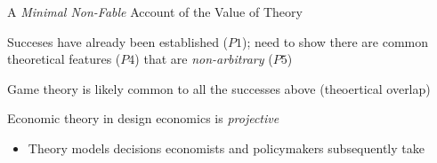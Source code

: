\documentclass[aspectratio=169,xcolor=dvipsnames]{beamer}
\begin{document}
\begin{frame}{A \textit{Minimal Non-Fable} Account of the Value of Theory}

\vspace{5mm}
Succeses have already been established ($P1$); need to show there are common theoretical features ($P4$) that are \textit{non-arbitrary} ($P5$)

\vspace{5mm}
Game theory is likely common to all the successes above (theoertical overlap)

\vspace{5mm}
Economic theory in design economics is \textit{projective} \autocite{guala2001}
\begin{itemize}
    \item Theory models decisions economists and policymakers subsequently take
\end{itemize}


\end{frame}













\end{document}

